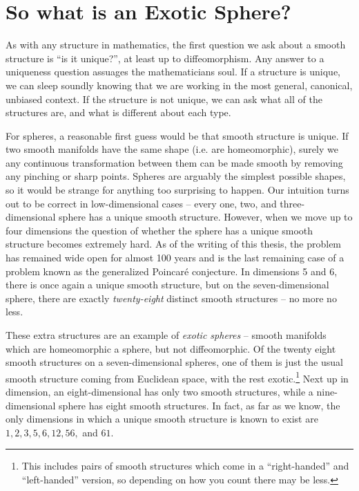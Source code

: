 \section*{So what is an Exotic Sphere?}

As with any structure in mathematics, the first question we ask about a smooth structure is ``is it unique?'', at least up to diffeomorphism. Any answer to a uniqueness question assuages the mathematicians soul. If a structure is unique, we can sleep soundly knowing that we are working in the most general, canonical, unbiased context. If the structure is not unique, we can ask what all of the structures are, and what is different about each type. 

For spheres, a reasonable first guess would be that smooth structure is unique. If two smooth manifolds have the same shape (i.e. are homeomorphic), surely we any continuous transformation between them can be made smooth by removing any pinching or sharp points. Spheres are arguably the simplest possible shapes, so it would be strange for anything too surprising to happen. Our intuition turns out to be correct in low-dimensional cases -- every one, two, and three-dimensional sphere has a unique smooth structure. 
%
However, when we move up to four dimensions the question of whether the sphere has a unique smooth structure becomes extremely hard. As of the writing of this thesis, the problem has remained wide open for almost 100 years and is the last remaining case of a problem known as the generalized Poincar\'e conjecture.
In dimensions 5 and 6, there is once again a unique smooth structure, but 
on the seven-dimensional sphere, there are exactly \emph{twenty-eight}
distinct smooth structures -- no more no less. 

These extra structures are an example of \emph{exotic spheres} -- smooth manifolds which are homeomorphic a sphere, but not diffeomorphic.
Of the twenty eight smooth structures on a seven-dimensional spheres, one of them is just the usual smooth structure coming from Euclidean space, with the rest exotic.\footnote{This includes pairs of smooth structures which come in a ``right-handed'' and ``left-handed'' version, so depending on how you count there may be less.} 
Next up in dimension, an eight-dimensional has only two smooth structures, while a nine-dimensional sphere has eight smooth structures. 
In fact, as far as we know, the only dimensions in which a unique smooth structure is known to exist are $1,2,3,5,6,12,56,$ and $61$.


